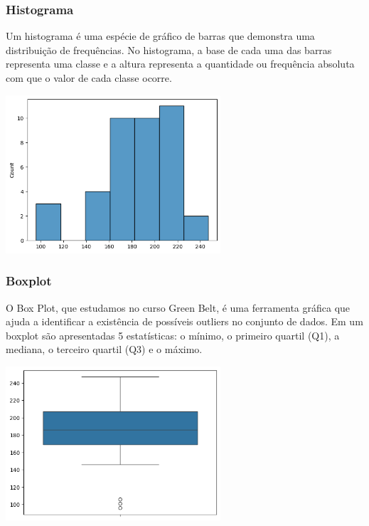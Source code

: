 \documentclass{article}
\begin{document}
\begin{multicols}{2}
    \subsubsection{Histograma}
      Um histograma é uma espécie de gráfico de barras que demonstra uma distribuição de frequências. No histograma, 
    a base de cada uma das barras representa uma classe e a altura representa a quantidade ou frequência absoluta com 
    que o valor de cada classe ocorre.

    \hbox{\includegraphics[width=8cm]{Histograma.png}}
    
    \subsubsection{Boxplot}  
    O Box Plot, que estudamos no curso Green Belt, é uma ferramenta gráfica que ajuda a identificar a existência de 
    possíveis outliers no conjunto de dados. Em um boxplot são apresentadas 5 estatísticas: o mínimo, o primeiro quartil 
    (Q1), a mediana, o terceiro quartil (Q3) e o máximo.
    
    \hbox{\includegraphics[width=8cm]{Boxplot.png}}   
    


\end{multicols} %
\end{document}
